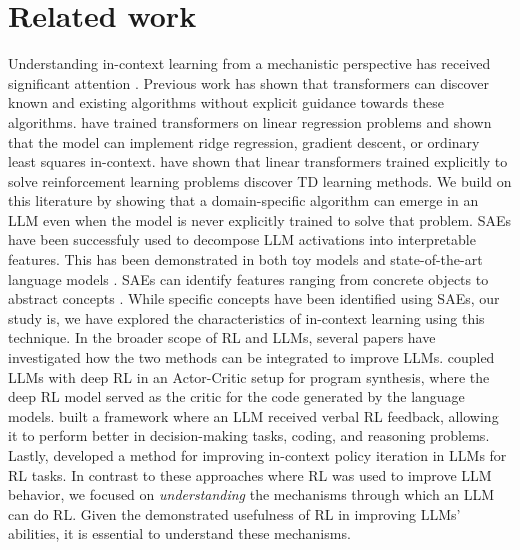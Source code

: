 \documentclass{article}
\begin{document}
\section{Related work}
Understanding in-context learning from a mechanistic perspective has received significant attention \citep{garg2022can, vonoswald2023transformerslearnincontextgradient,dai2023gptlearnincontextlanguage, ahn2023transformerslearnimplementpreconditioned}. Previous work has shown that transformers can discover known and existing algorithms without explicit guidance towards these algorithms. \citet{akyürek2023learningalgorithmincontextlearning} have trained transformers on linear regression problems and shown that the model can implement ridge regression, gradient descent, or ordinary least squares in-context. \citet{wang2024transformerslearntemporaldifference} have shown that linear transformers trained explicitly to solve reinforcement learning problems discover TD learning methods. We build on this literature by showing that a domain-specific algorithm can emerge in an LLM even when the model is never explicitly trained to solve that problem.
SAEs have been successfuly used to decompose LLM activations into interpretable features. This has been demonstrated in both toy models \citep{cunningham2023sparse,bricken_towards_2023} and state-of-the-art language models \citep{gao2024scaling}. SAEs can identify features ranging from concrete objects to abstract concepts \citep{templeton2024scaling}. While specific concepts have been identified using SAEs, our study is, we have explored the characteristics of in-context learning using this technique.
In the broader scope of RL and LLMs, several papers have investigated how the two methods can be integrated to improve LLMs.  \citet{le2022coderlmasteringcodegeneration} coupled LLMs with deep RL in an Actor-Critic \citep{konda1999actor} setup for program synthesis, where the deep RL model served as the critic for the code generated by the language models. \citet{shinn2024reflexion} built a framework where an LLM received verbal RL feedback, allowing it to perform better in decision-making tasks, coding, and reasoning problems. Lastly, \citet{brooks2022context} developed a method for improving in-context policy iteration in LLMs for RL tasks. In contrast to these approaches where RL was used to improve LLM behavior, we focused on \textit{understanding} the mechanisms through which an LLM can do RL. Given the demonstrated usefulness of RL in improving LLMs' abilities, it is essential to understand these mechanisms.
\end{document}
